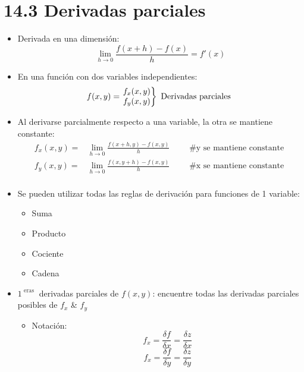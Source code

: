 % 

% 
    


\section{14.3 Derivadas parciales}
\begin{itemize}
    \item Derivada en una dimensión:
        \[
          \lim_{h \to 0} \frac{f(x+h)-f(x)}{h} = f'(x)  
        \]
    
    \item En una función con dos variables independientes:
        \begin{align*}
            f(x,y) = \begin{rcases}
                \begin{matrix}
                    f_x(x,y) \\ 
                    f_y(x,y) \\ 
                \end{matrix}  
            \end{rcases} \text{  Derivadas parciales  } \\
        \end{align*}
    
    \item Al derivarse parcialmente respecto a una variable, la otra se mantiene constante:
        \begin{align*}
            f_x(x,y) =& \lim_{h \to 0} \frac{f(x+h,y)-f(x,y)}{h} \quad \quad \text{  \# y se mantiene constante  }\\  
            f_y(x,y) =& \lim_{h \to 0} \frac{f(x,y+h)-f(x,y)}{h} \quad \quad \text{ \# x se mantiene constante  }\\  
        \end{align*}
    
    \item Se pueden utilizar todas las reglas de derivación para funciones de 1 variable:
        \begin{itemize}
            \item Suma 
            \item Producto 
            \item Cociente 
            \item Cadena 
        \end{itemize}
    
    \item $1^{\text{  eras  }}$ derivadas parciales de $f(x,y)$: encuentre todas las derivadas parciales posibles de $f_x$ \& $f_y$
        \begin{itemize}
            \item Notación:
                \[
                  f_x=\frac{\delta f}{\delta x} = \frac{\delta z}{\delta x}  
                \]
                \[
                    f_x=\frac{\delta f}{\delta y} = \frac{\delta z}{\delta y}  
                \]
            

\end{itemize}
\end{itemize}
